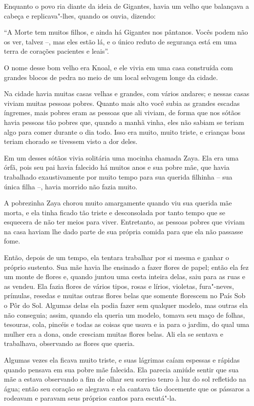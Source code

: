 Enquanto o povo ria diante da ideia de Gigantes, havia um velho que
balançava a cabeça e replicava"-lhes, quando os ouvia, dizendo:

``A Morte tem muitos filhos, e ainda há Gigantes nos pântanos. Vocês
podem não os ver, talvez --, mas eles estão lá, e o único reduto de
segurança está em uma terra de corações pacientes e leais''.

O nome desse bom velho era Knoal, e ele vivia em uma casa construída com
grandes blocos de pedra no meio de um local selvagem longe da cidade.

Na cidade havia muitas casas velhas e grandes, com vários andares; e
nessas casas viviam muitas pessoas pobres. Quanto mais alto você subia
as grandes escadas íngremes, mais pobres eram as pessoas que ali viviam,
de forma que nos sótãos havia pessoas tão pobres que, quando a manhã
vinha, eles não sabiam se teriam algo para comer durante o dia todo.
Isso era muito, muito triste, e crianças boas teriam chorado se tivessem
visto a dor deles.

Em um desses sótãos vivia solitária uma mocinha chamada Zaya. Ela era
uma órfã, pois seu pai havia falecido há muitos anos e sua pobre mãe,
que havia trabalhado exaustivamente por muito tempo para sua querida
filhinha -- sua única filha --, havia morrido não fazia muito.

A pobrezinha Zaya chorou muito amargamente quando viu sua querida mãe
morta, e ela tinha ficado tão triste e desconsolada por tanto tempo que
se esquecera de não ter meios para viver. Entretanto, as pessoas pobres
que viviam na casa haviam lhe dado parte de sua própria comida para que
ela não passasse fome.

Então, depois de um tempo, ela tentara trabalhar por si mesma e ganhar o
próprio sustento. Sua mãe havia lhe ensinado a fazer flores de papel;
então ela fez um monte de flores e, quando juntou uma cesta inteira
delas, saiu para as ruas e as vendeu. Ela fazia flores de vários tipos,
rosas e lírios, violetas, fura"-neves, prímulas, resedas e muitas outras
flores belas que somente florescem no País Sob o Pôr do Sol. Algumas
delas ela podia fazer sem qualquer modelo, mas outras ela não conseguia;
assim, quando ela queria um modelo, tomava seu maço de folhas, tesouras,
cola, pincéis e todas as coisas que usava e ia para o jardim, do qual
uma mulher era a dona, onde cresciam muitas flores belas. Ali ela se
sentava e trabalhava, observando as flores que queria.

Algumas vezes ela ficava muito triste, e suas lágrimas caíam espessas e
rápidas quando pensava em sua pobre mãe falecida. Ela parecia amiúde
sentir que sua mãe a estava observando a fim de olhar seu sorriso tenro
à luz do sol refletido na água; então seu coração se alegrava e ela
cantava tão docemente que os pássaros a rodeavam e paravam seus próprios
cantos para escutá"-la.

